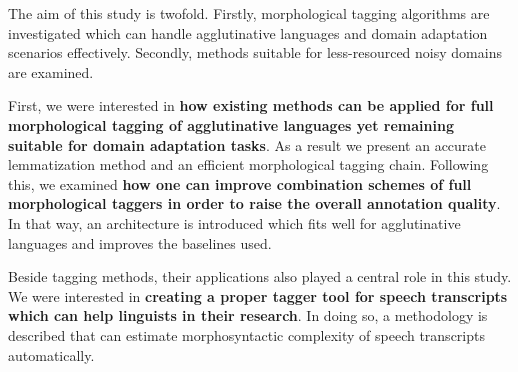 The aim of this study is twofold. 
Firstly, morphological tagging algorithms are investigated which can handle agglutinative languages and domain adaptation scenarios effectively. 
Secondly, methods suitable for less-resourced noisy domains are examined.

First, we were interested in \textbf{how existing methods can be applied for full morphological tagging of agglutinative languages yet remaining suitable for domain adaptation tasks}. 
As a result we present an accurate lemmatization method and an efficient morphological tagging chain.
Following this, we examined \textbf{how one can improve combination schemes of full morphological taggers in order to raise the overall annotation quality}.
In that way, an architecture is introduced which fits well for agglutinative languages and improves the baselines used.

Beside tagging methods, their applications also played a central role in this study. %
We were interested in \textbf{creating a proper tagger tool for speech transcripts which can help linguists in their research}.
In doing so, 
a methodology is described that can estimate morphosyntactic complexity of speech transcripts automatically.

